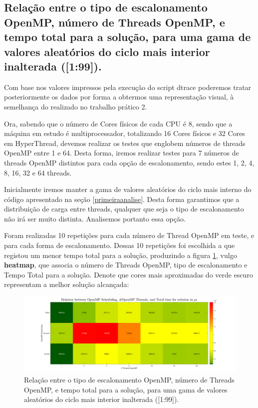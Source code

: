 \documentclass[a4paper]{article}
\begin{document}
   \subsection{Relação entre o tipo de escalonamento OpenMP, número de Threads OpenMP, e tempo total para a solução, para uma gama de valores aleatórios do ciclo mais interior inalterada ([1:99]).}
\label{tempos_exe3_gama_inalterada}
  Com base nos valores impressos pela execução do script dtrace poderemos tratar posteriormente os dados por forma a obtermos uma representação visual, à semelhança do realizado no trabalho prático 2.\par 
  Ora, sabendo que o número de Cores físicos de cada CPU é 8, sendo que a máquina em estudo é multiprocessador, totalizando 16 Cores físicos e 32 Cores em HyperThread, devemos realizar os testes que englobem números de threads OpenMP entre 1 e 64. Desta forma, iremos realizar testes para 7 números de threads OpenMP distintos para cada opção de escalonamento, sendo estes 1, 2, 4, 8, 16, 32 e 64 threads.\par 
  Inicialmente iremos manter a gama de valores aleatórios do ciclo mais interno do código apresentado na seção \ref{primeiraanalise}. Desta forma garantimos que a distribuição de carga entre threads, qualquer que seja o tipo de escalonamento não irá ser muito distinta. Analisemos portanto essa opção.\par 
  Foram realizadas 10 repetições para cada número de Thread OpenMP em teste, e para cada forma de escalonamento. Dessas 10 repetições foi escolhida a que registou um menor tempo total para a solução, produzindo a figura \ref{fig:heatmap_scheduling_openmp}, vulgo \textbf{heatmap}, que associa o número de Threads OpenMP, tipo de escalonamento e Tempo Total para a solução. Denote que cores mais aproximadas do verde escuro representam a melhor solução alcançada:
     \begin{figure}[H]
    \centering
    \includegraphics[width=1\columnwidth]{PNG/heatmap_scheduling_openmp.png}
        \caption{ Relação entre o tipo de escalonamento OpenMP, número de Threads OpenMP, e tempo total para a solução, para uma gama de valores aleatórios do ciclo mais interior inalterada ([1:99]). }
    \label{fig:heatmap_scheduling_openmp}
    \end{figure}
    
\end{document}
